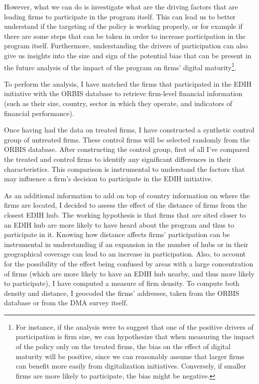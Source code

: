 \documentclass[12pt]{report}
\begin{document}
\par However, what we can do is investigate what are the driving factors that are leading firms to participate in the program itself. This can lead us to better understand if the targeting of the policy is working properly, or for example if there are some steps that can be taken in order to increase participation in the program itself. Furthermore, understanding the drivers of participation can also give us insights into the size and sign of the potential bias that can be present in the future analysis of the impact of the program on firms' digital maturity\footnote{For instance, if the analysis were to suggest that one of the positive drivers of participation is firm size, we can hypothesize that when measuring the impact of the policy only on the treated firms, the bias on the effect of digital maturity will be positive, since we can reasonably assume that larger firms can benefit more easily from digitalization initiatives. Conversely, if smaller firms are more likely to participate, the bias might be negative.}.

\par To perform the analysis, I have matched the firms that participated in the EDIH initiative with the ORBIS database to retrieve firm-level financial information (such as their size, country, sector in which they operate, and indicators of financial performance).

\par Once having had the data on treated firms, I have constructed a synthetic control group of untreated firms. These control firms will be selected randomly from the ORBIS database. After constructing the control group, first of all I've compared the treated and control firms to identify any significant differences in their characteristics. This comparison is instrumental to understand the factors that may influence a firm's decision to participate in the EDIH initiative.

\par As an additional information to add on top of country information on where the firms are located, I decided to assess the effect of the distance of firms from the closest EDIH hub. The working hypothesis is that firms that are sited closer to an EDIH hub are more likely to have heard about the program and thus to participate in it. Knowing how distance affects firms' participation can be instrumental in understanding if an expansion in the number of hubs or in their geographical coverage can lead to an increase in participation. Also, to account for the possibility of the effect being confused by areas with a large concentration of firms (which are more likely to have an EDIH hub nearby, and thus more likely to participate), I have computed a measure of firm density. To compute both density and distance, I geocoded the firms' addresses, taken from the ORBIS database or from the DMA survey itself.
\end{document}
